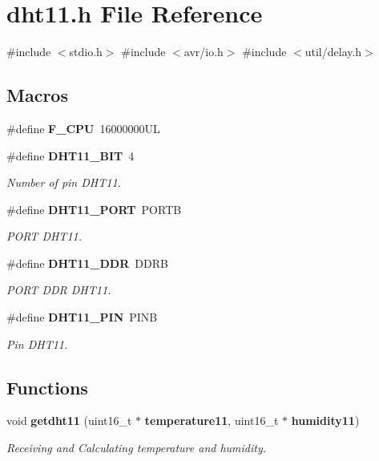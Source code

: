 \section{dht11.\+h File Reference}
\label{dht11_8h}
{\ttfamily \#include $<$stdio.\+h$>$}\newline
{\ttfamily \#include $<$avr/io.\+h$>$}\newline
{\ttfamily \#include $<$util/delay.\+h$>$}\newline
\subsection*{Macros}
\begin{DoxyCompactItemize}
\item 
\#define \textbf{ F\+\_\+\+C\+PU}~16000000\+UL
\item 
\#define \textbf{ D\+H\+T11\+\_\+\+B\+IT}~4
\begin{DoxyCompactList}\small\item\em Number of pin D\+H\+T11. \end{DoxyCompactList}\item 
\#define \textbf{ D\+H\+T11\+\_\+\+P\+O\+RT}~P\+O\+R\+TB
\begin{DoxyCompactList}\small\item\em P\+O\+RT D\+H\+T11. \end{DoxyCompactList}\item 
\#define \textbf{ D\+H\+T11\+\_\+\+D\+DR}~D\+D\+RB
\begin{DoxyCompactList}\small\item\em P\+O\+RT D\+DR D\+H\+T11. \end{DoxyCompactList}\item 
\#define \textbf{ D\+H\+T11\+\_\+\+P\+IN}~P\+I\+NB
\begin{DoxyCompactList}\small\item\em Pin D\+H\+T11. \end{DoxyCompactList}\end{DoxyCompactItemize}
\subsection*{Functions}
\begin{DoxyCompactItemize}
\item 
void \textbf{ getdht11} (uint16\+\_\+t $\ast$\textbf{ temperature11}, uint16\+\_\+t $\ast$\textbf{ humidity11})
\begin{DoxyCompactList}\small\item\em Receiving and Calculating temperature and humidity. \end{DoxyCompactList}\end{DoxyCompactItemize}


